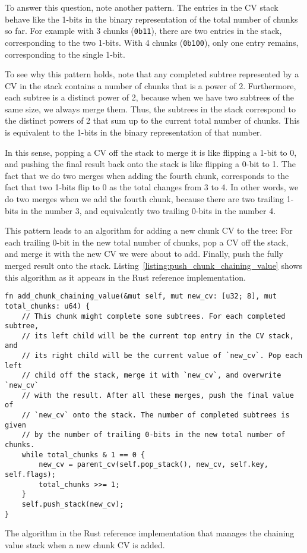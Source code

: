 \documentclass[11pt,notitlepage,a4paper]{article}
\begin{document}
To answer this question, note another pattern. The entries in the CV stack
behave like the 1-bits in the binary representation of the total number of
chunks so far. For example with 3 chunks (\texttt{0b11}), there are two entries in the
stack, corresponding to the two 1-bits. With 4 chunks (\texttt{0b100}), only one entry
remains, corresponding to the single 1-bit.

To see why this pattern holds, note that any completed subtree represented by a
CV in the stack contains a number of chunks that is a power of 2. Furthermore,
each subtree is a distinct power of 2, because when we have two subtrees of the
same size, we always merge them. Thus, the subtrees in the stack correspond to
the distinct powers of 2 that sum up to the current total number of chunks.
This is equivalent to the 1-bits in the binary representation of that number.

In this sense, popping a CV off the stack to merge it is like flipping a 1-bit
to 0, and pushing the final result back onto the stack is like flipping a 0-bit
to 1. The fact that we do two merges when adding the fourth chunk, corresponds
to the fact that two 1-bits flip to 0 as the total changes from 3 to 4. In
other words, we do two merges when we add the fourth chunk, because there are
two trailing 1-bits in the number 3, and equivalently two trailing 0-bits in
the number 4.

This pattern leads to an algorithm for adding a new chunk CV to the tree: For
each trailing 0-bit in the new total number of chunks, pop a CV off the stack,
and merge it with the new CV we were about to add. Finally, push the fully
merged result onto the stack. Listing~\ref{listing:push_chunk_chaining_value}
shows this algorithm as it appears in the Rust reference implementation.

\begin{listing}[h]
\begin{verbatim}
fn add_chunk_chaining_value(&mut self, mut new_cv: [u32; 8], mut total_chunks: u64) {
    // This chunk might complete some subtrees. For each completed subtree,
    // its left child will be the current top entry in the CV stack, and
    // its right child will be the current value of `new_cv`. Pop each left
    // child off the stack, merge it with `new_cv`, and overwrite `new_cv`
    // with the result. After all these merges, push the final value of
    // `new_cv` onto the stack. The number of completed subtrees is given
    // by the number of trailing 0-bits in the new total number of chunks.
    while total_chunks & 1 == 0 {
        new_cv = parent_cv(self.pop_stack(), new_cv, self.key, self.flags);
        total_chunks >>= 1;
    }
    self.push_stack(new_cv);
}
\end{verbatim}
\caption{The algorithm in the Rust reference implementation that manages the
    chaining value stack when a new chunk CV is added.}
\label{listing:push_chunk_chaining_value}
\end{listing}
\end{document}
